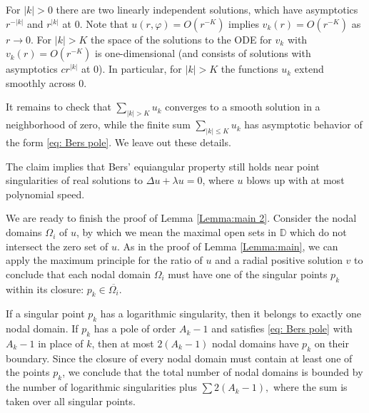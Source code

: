 \documentclass{article}
\begin{document}
For $|k|>0$ there are two linearly independent solutions, which have asymptotics $r^{-|k|}$ and $r^{|k|}$ at $0$.
Note that  $u(r,\varphi) = O(r^{-K})$ implies $v_k(r)=O(r^{-K})$ as $r \to 0$. For $|k|>K$ the space of the solutions to the ODE for $v_k$ with $v_k(r)=O(r^{-K})$ is one-dimensional (and consists of solutions with asymptotics $cr^{|k|}$ at $0$). In particular, for $|k|>K$ the functions $u_k$ extend smoothly across $0$.

It remains to check that $\sum\limits_{|k|>K} u_k$ converges to a smooth solution in a neighborhood of zero, while the finite sum $\sum\limits_{|k|\leq K} u_k$ has asymptotic behavior of the form \eqref{eq: Bers pole}. We leave out these details.

The claim implies that Bers' equiangular property still holds near point singularities of real solutions to $\Delta u + \lambda u=0$, where $u$ blows up with at most polynomial speed. 

We are ready to finish the proof of Lemma \ref{Lemma:main 2}. Consider the nodal domains $\Omega_i$ of $u$, by which we mean the maximal open sets in $\mathbb{D}$ which do not intersect the zero set of $u$. As in the proof of Lemma \ref{Lemma:main}, we can apply the maximum principle
for the ratio of $u$ and a radial positive solution $v$ to conclude that
each nodal domain $\Omega_i$ must have one of the singular points $p_k$ within its closure: $p_k \in \overline{\Omega_i}$. 

If a singular point $p_k$ has a logarithmic singularity, then it belongs to exactly one nodal domain. If $p_k$ has a pole of order $A_k-1$ and satisfies \eqref{eq: Bers pole} with $A_k-1$ in place of $k$, then at most $2(A_k-1)$ nodal domains have $p_k$ on their boundary.
Since the closure of every nodal domain must contain at least one of the points $p_k$, we conclude that the total number of nodal domains is bounded by the number of logarithmic singularities plus
$
\sum 2(A_k-1),
$
where the sum is taken over all singular points.
\end{document}
